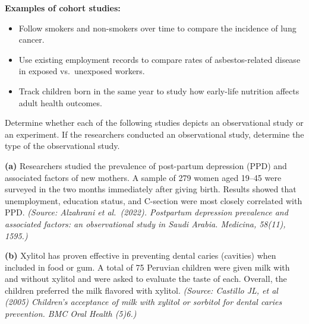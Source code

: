 \documentclass{ximera}
\begin{document}
\textbf{Examples of cohort studies:}
\begin{itemize}
  \item Follow smokers and non-smokers over time to compare the incidence of lung cancer.
  \item Use existing employment records to compare rates of asbestos-related disease in exposed vs.\ unexposed workers.
  \item Track children born in the same year to study how early-life nutrition affects adult health outcomes.
\end{itemize}

\begin{problem}
Determine whether each of the following studies depicts an observational study or an experiment. If the researchers conducted an observational study, determine the type of the observational study.

\begin{question}
\textbf{(a)} Researchers studied the prevalence of post-partum depression (PPD) and associated factors of new mothers. A sample of 279 women aged 19--45 were surveyed in the two months immediately after giving birth. Results showed that unemployment, education status, and C-section were most closely correlated with PPD. \emph{(Source: Alzahrani et al.\ (2022). Postpartum depression prevalence and associated factors: an observational study in Saudi Arabia. Medicina, 58(11), 1595.)}
\begin{multipleChoice}
\end{multipleChoice}
\end{question}

\begin{question}
\textbf{(b)} Xylitol has proven effective in preventing dental caries (cavities) when included in food or gum. A total of 75 Peruvian children were given milk with and without xylitol and were asked to evaluate the taste of each. Overall, the children preferred the milk flavored with xylitol. \emph{(Source: Castillo JL, et al (2005) Children's acceptance of milk with xylitol or sorbitol for dental caries prevention. BMC Oral Health (5)6.)}
\begin{multipleChoice}
\end{multipleChoice}
\end{question}


\end{problem}
\end{document}
